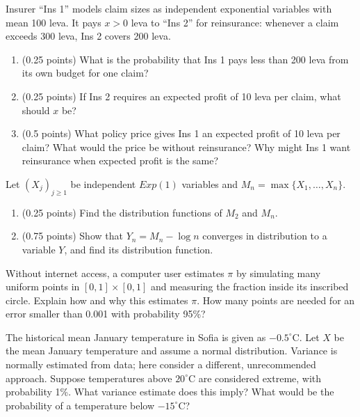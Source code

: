 \documentclass[a4paper]{report}
\begin{document}
\begin{problempencil}
Insurer ``Ins 1'' models claim sizes as independent exponential variables with mean 100 leva. It pays $x>0$ leva to ``Ins 2'' for reinsurance: whenever a claim exceeds 300 leva, Ins 2 covers 200 leva.
\begin{enumerate}
\item (0.25 points) What is the probability that Ins 1 pays less than 200 leva from its own budget for one claim?
\item (0.25 points) If Ins 2 requires an expected profit of 10 leva per claim, what should $x$ be?
\item (0.5 points) What policy price gives Ins 1 an expected profit of 10 leva per claim? What would the price be without reinsurance? Why might Ins 1 want reinsurance when expected profit is the same?
\end{enumerate}
\end{problempencil}
\begin{problempencil}
Let $(X_j)_{j\ge1}$ be independent $Exp(1)$ variables and $M_n=\max\{X_1,\dots,X_n\}$.
\begin{enumerate}
\item (0.25 points) Find the distribution functions of $M_2$ and $M_n$.
\item (0.75 points) Show that $Y_n=M_n-\log n$ converges in distribution to a variable $Y$, and find its distribution function.
\end{enumerate}
\end{problempencil}
\begin{problempencil}
Without internet access, a computer user estimates $\pi$ by simulating many uniform points in $[0,1]\times[0,1]$ and measuring the fraction inside its inscribed circle. Explain how and why this estimates $\pi$. How many points are needed for an error smaller than 0.001 with probability 95\%?
\end{problempencil}
\begin{problempencil}
The historical mean January temperature in Sofia is given as $-0.5^\circ\mathrm C$. Let $X$ be the mean January temperature and assume a normal distribution. Variance is normally estimated from data; here consider a different, unrecommended approach. Suppose temperatures above $20^\circ\mathrm C$ are considered extreme, with probability 1\%. What variance estimate does this imply? What would be the probability of a temperature below $-15^\circ\mathrm C$?
\end{problempencil}
\end{document}
